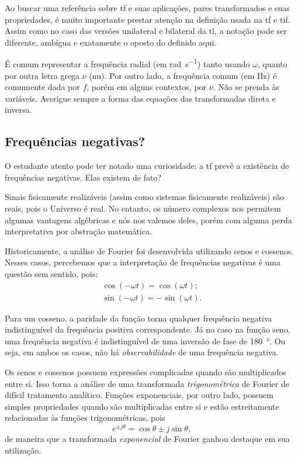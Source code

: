 Ao buscar uma referência sobre \ac{tf} e suas aplicações, pares transformados e suas propriedades, é muito importante prestar atenção na definição usada na \ac{tf} e \ac{tif}. Assim como no caso das versões unilateral e bilateral da \ac{tl}, a notação pode ser diferente, ambígua e exatamente o oposto do definido aqui.

É comum representar a frequência radial (em \unit{\radian\per\second}) tanto usando $\omega$, quanto por outra letra grega $\nu$ (nu). Por outro lado, a frequência comum (em \unit{\hertz}) é comumente dada por $f$, porém em alguns contextos, por $\nu$. Não se prenda às variáveis. Averigue sempre a forma das equações das transformadas direta e inversa.

\subsection{Frequências negativas?}

O estudante atento pode ter notado uma curiosidade: a \ac{tf} prevê a existência de frequências negativas. Elas existem de fato?

Sinais fisicamente realizáveis (assim como sistemas fisicamente realizáveis) são reais, pois o Universo é real. No entanto, os número complexos nos permitem algumas vantagens algébricas e nós nos valemos deles, porém com alguma perda interpretativa por abstração matemática.

Historicamente, a análise de Fourier foi desenvolvida utilizando senos e cossenos. Nesses casos, percebemos que a interpretação de frequências negativas é uma questão sem sentido, pois:
\begin{gather*}
	\cos(-\omega t)=\cos(\omega t);\\
	\sin(-\omega t)=-\sin(\omega t).
\end{gather*}

Para um cosseno, a paridade da função torna qualquer frequência negativa indistinguível da frequência positiva correspondente. Já no caso na função seno, uma frequência negativa é indistinguível de uma inversão de fase de \qty{180}{\degree}. Ou seja, em ambos os casos, não há \emph{observabilidade} de uma frequência negativa.

Os senos e cossenos possuem expressões complicadas quando são multiplicados entre si. Isso torna a análise de uma transformada \emph{trigonométrica} de Fourier de difícil tratamento analítico. Funções exponenciais, por outro lado, possuem simples propriedades quando são multiplicadas entre si e estão estreitamente relacionadas às funções trigonométricas, pois
\begin{equation}\label{eq:euler}
	e^{\pm j\theta}=\cos\theta\pm j\sin\theta,
\end{equation}
de maneira que a transformada \emph{exponencial} de Fourier ganhou destaque em sua utilização.

